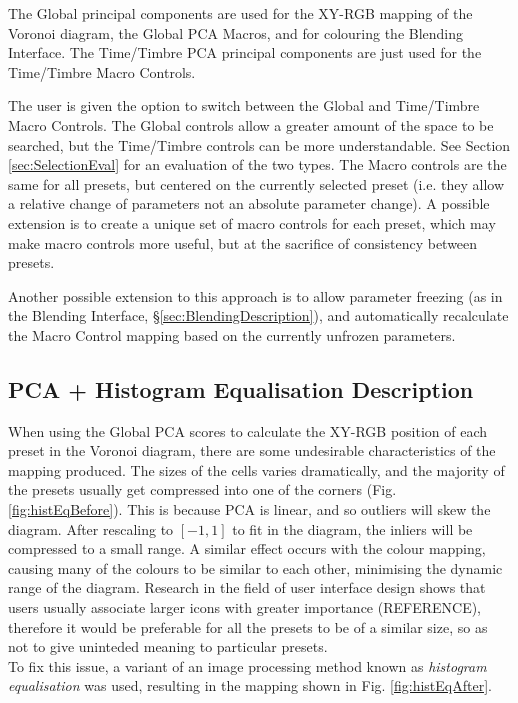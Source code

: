 \documentclass[11pt, oneside]{report}   	%
\begin{document}
The Global principal components are used for the XY-RGB mapping of the Voronoi diagram, the Global PCA Macros, and for colouring the Blending Interface. The Time/Timbre PCA principal components are just used for the Time/Timbre Macro Controls.

The user is given the option to switch between the Global and Time/Timbre Macro Controls. The Global controls allow a greater amount of the space to be searched, but the Time/Timbre controls can be more understandable. See Section \ref{sec:SelectionEval} for an evaluation of the two  types.
The Macro controls are the same for all presets, but centered on the currently selected preset (i.e. they allow a relative change of parameters not an absolute parameter change). A possible extension is to create a unique set of macro controls for each preset, which may make macro controls more useful, but at the sacrifice of consistency between presets.

Another possible extension to this approach is to allow parameter freezing (as in the Blending Interface, \S \ref{sec:BlendingDescription}), and automatically recalculate the Macro Control mapping based on the currently unfrozen parameters.


\subsection{PCA + Histogram Equalisation Description}
When using the Global PCA scores to calculate the XY-RGB position of each preset in the Voronoi diagram, there are some undesirable characteristics of the mapping produced. The sizes of the cells varies dramatically, and the majority of the presets usually get compressed into one of the corners (Fig. \ref{fig:histEqBefore}). This is because PCA is linear, and so outliers will skew the diagram. After rescaling to $[-1, 1]$ to fit in the diagram, the inliers will be compressed to a small range. A similar effect occurs with the colour mapping, causing many of the colours to be similar to each other, minimising the dynamic range of the diagram. Research in the field of user interface design shows that users usually associate larger icons with greater importance (REFERENCE), therefore it would be preferable for all the presets to be of a similar size, so as not to give uninteded meaning to particular presets.\\
To fix this issue, a variant of an image processing method known as \emph{histogram equalisation} \cite{HistogramEqualisation} was used, resulting in the mapping shown in Fig. \ref{fig:histEqAfter}.
\end{document}
